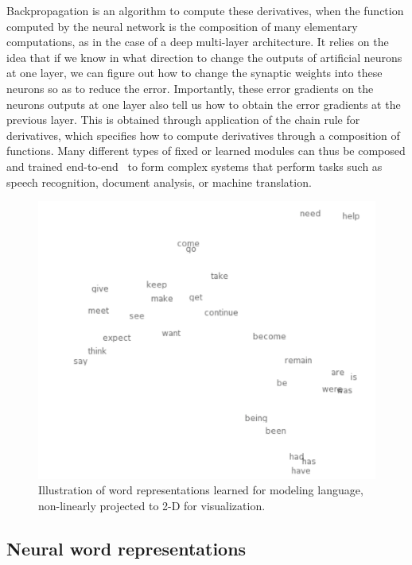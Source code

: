 \documentclass[11pt]{article} %
\begin{document}
Backpropagation is an algorithm to compute these derivatives, when the
function computed by the neural network is the composition of many
elementary computations, as in the case of a deep multi-layer
architecture. It relies on the idea that if we know in what direction to
change the outputs of artificial neurons at one layer, we can figure out
how to change the synaptic weights into these neurons so as to reduce the
error. Importantly, these error gradients on the neurons outputs at one
layer also tell us how to obtain the error gradients at the previous
layer. This is obtained through application of the chain rule for
derivatives, which specifies how to compute derivatives through a
composition of functions.  Many different types of fixed or learned
modules can thus be composed and trained end-to-end~\citep{LeCun98} 
to form complex systems that perform
tasks such as speech recognition, document analysis, or machine
translation.

\begin{figure}[H]
\centerline{\includegraphics[width=0.7\linewidth]{word-embeddings.png}}
\caption{Illustration of word representations learned for modeling
language, non-linearly projected to 2-D for visualization.}
\end{figure}



\subsection{Neural word representations}
\end{document}
